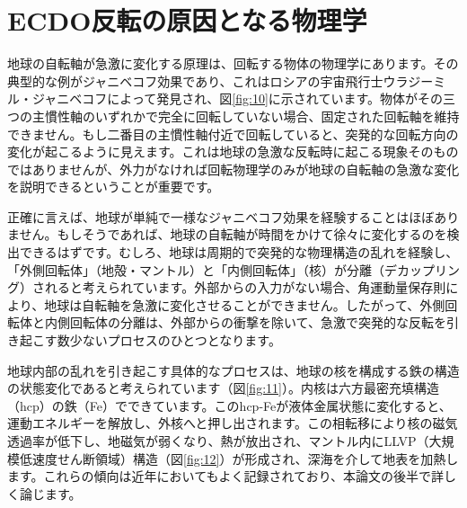 \documentclass[10pt,twocolumn,letterpaper]{article}
\begin{document}
\section{ECDO反転の原因となる物理学}

地球の自転軸が急激に変化する原理は、回転する物体の物理学にあります。その典型的な例がジャニベコフ効果であり、これはロシアの宇宙飛行士ウラジーミル・ジャニベコフによって発見され、図\ref{fig:10}に示されています。物体がその三つの主慣性軸のいずれかで完全に回転していない場合、固定された回転軸を維持できません。もし二番目の主慣性軸付近で回転していると、突発的な回転方向の変化が起こるように見えます。これは地球の急激な反転時に起こる現象そのものではありませんが、外力がなければ回転物理学のみが地球の自転軸の急激な変化を説明できるということが重要です。

正確に言えば、地球が単純で一様なジャニベコフ効果を経験することはほぼありません。もしそうであれば、地球の自転軸が時間をかけて徐々に変化するのを検出できるはずです。むしろ、地球は周期的で突発的な物理構造の乱れを経験し、「外側回転体」（地殻・マントル）と「内側回転体」（核）が分離（デカップリング）されると考えられています。外部からの入力がない場合、角運動量保存則により、地球は自転軸を急激に変化させることができません。したがって、外側回転体と内側回転体の分離は、外部からの衝撃を除いて、急激で突発的な反転を引き起こす数少ないプロセスのひとつとなります。

地球内部の乱れを引き起こす具体的なプロセスは、地球の核を構成する鉄の構造の状態変化であると考えられています（図\ref{fig:11}）。内核は六方最密充填構造（hcp）の鉄（Fe）でできています\cite{141}。このhcp-Feが液体金属状態に変化すると、運動エネルギーを解放し、外核へと押し出されます。この相転移により核の磁気透過率が低下し、地磁気が弱くなり、熱が放出され、マントル内にLLVP（大規模低速度せん断領域）構造（図\ref{fig:12}）\cite{38}が形成され、深海を介して地表を加熱します。これらの傾向は近年においてもよく記録されており、本論文の後半で詳しく論じます。

\end{document}
